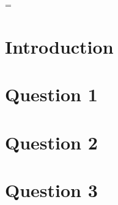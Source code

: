 \emergencystretch=\maxdimen
{}

\maketitle              %
\newpage                %
\tableofcontents        %
\newpage                %

\section{Introduction}

\section{Question 1}

\section{Question 2}

\section{Question 3}



